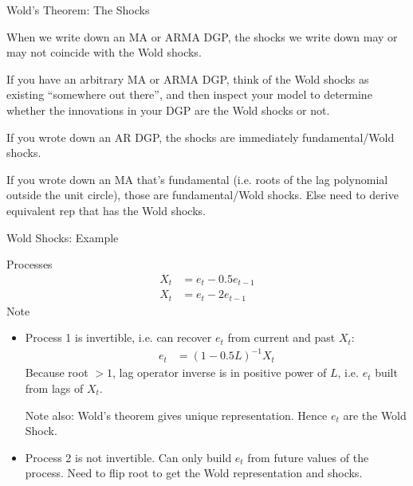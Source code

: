 \documentclass[aspectratio=169, handout]{beamer}
\begin{document}
\begin{frame}[shrink]{Wold's Theorem: The Shocks}

When we write down an MA or ARMA DGP, the shocks we write down
\alert{may or may not} coincide with the Wold shocks.

If you have an arbitrary MA or ARMA DGP, think of the Wold shocks as
existing ``somewhere out there'', and then inspect your model to
determine whether the innovations in your DGP are the Wold shocks or
not.

If you wrote down an AR DGP, the shocks are immediately fundamental/Wold
shocks.

If you wrote down an MA that's fundamental (i.e. roots of the lag
polynomial outside the unit circle), those are fundamental/Wold shocks.
Else need to derive equivalent rep that has the Wold shocks.

%
%
%
\end{frame}


\begin{frame}[shrink]{Wold Shocks: Example}

Processes
\begin{align*}
  X_t &= e_t - 0.5 e_{t-1}
  \\
  X_t &= e_t - 2 e_{t-1}
\end{align*}
Note
\begin{itemize}
  \item Process 1 is \alert{invertible}, i.e. can recover $e_t$ from
    current and past $X_t$:
    \begin{align*}
      e_t &= (1-0.5L)^{-1}X_t
    \end{align*}
    Because root $>1$, lag operator inverse is in positive power of $L$,
    i.e. $e_t$ built from lags of $X_t$.

    Note also: Wold's theorem gives \alert{unique} representation.
    Hence $e_t$ are the Wold Shock.

  \item
    Process 2 is \alert{not} invertible.
    Can only build $e_t$ from future values of the process.
    Need to flip root to get the Wold representation and shocks.

\end{itemize}

\end{frame}
\end{document}
